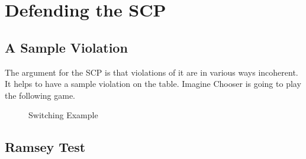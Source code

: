 \documentclass[
  10pt,
  letterpaper,
  DIV=11,
  numbers=noendperiod,
  twoside]{scrartcl}
\begin{document}
\section{Defending the SCP}\label{sec-scp-defence}

\subsection{A Sample Violation}\label{a-sample-violation}

The argument for the SCP is that violations of it are in various ways
incoherent. It helps to have a sample violation on the table. Imagine
Chooser is going to play the following game.

\begin{figure}


\caption{\label{fig-sample-violation}Switching Example}

\end{figure}%

\subsection{Ramsey Test}\label{ramsey-test}
\end{document}
